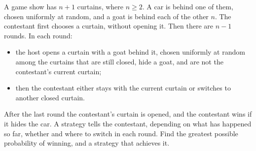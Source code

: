 A game show has $n+1$ curtains, where $n\ge2$. A car is behind one of them, chosen uniformly at random, and a goat is behind each of the other $n$. The contestant first chooses a curtain, without opening it. Then there are $n-1$ rounds. In each round:
\begin{itemize}
\item the host opens a curtain with a goat behind it, chosen uniformly at random among the curtains that are still closed, hide a goat, and are not the contestant's current curtain;
\item then the contestant either stays with the current curtain or switches to another closed curtain.
\end{itemize}
After the last round the contestant's curtain is opened, and the contestant wins if it hides the car. A strategy tells the contestant, depending on what has happened so far, whether and where to switch in each round. Find the greatest possible probability of winning, and a strategy that achieves it.
